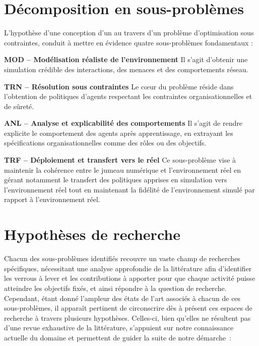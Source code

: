\section{Décomposition en sous-problèmes}

L'hypothèse d'une conception d'un  au travers d'un problème d'optimisation sous contraintes, conduit à mettre en évidence quatre sous-problèmes fondamentaux :

\medskip
\noindent
\textbf{\textbf{MOD} -- Modélisation réaliste de l'environnement}
Il s'agit d'obtenir une simulation crédible des interactions, des menaces et des comportements réseau.

\medskip
\noindent
\textbf{\textbf{TRN} -- Résolution sous contraintes}
Le cœur du problème réside dans l'obtention de politiques d'agents respectant les contraintes organisationnelles et de sûreté.

\medskip
\noindent
\textbf{\textbf{ANL} -- Analyse et explicabilité des comportements}
Il s'agit de rendre explicite le comportement des agents après apprentissage, en extrayant les spécifications organisationnelles comme des rôles ou des objectifs.

\medskip
\noindent
\textbf{\textbf{TRF} -- Déploiement et transfert vers le réel}
Ce sous-problème vise à maintenir la cohérence entre le jumeau numérique et l'environnement réel en gérant notamment le transfert des politiques apprises en simulation vers l'environnement réel tout en maintenant la fidélité de l'environnement simulé par rapport à l'environnement réel.

\clearpage

\section{Hypothèses de recherche}

Chacun des sous-problèmes identifiés recouvre un vaste champ de recherches spécifiques, nécessitant une analyse approfondie de la littérature afin d'identifier les verrous à lever et les contributions à apporter pour que chaque activité puisse atteindre les objectifs fixés, et ainsi répondre à la question de recherche. Cependant, étant donné l'ampleur des états de l'art associés à chacun de ces sous-problèmes, il apparaît pertinent de circonscrire dès à présent ces espaces de recherche à travers plusieurs hypothèses. Celles-ci, bien qu'elles ne résultent pas d'une revue exhaustive de la littérature, s'appuient sur notre connaissance actuelle du domaine et permettent de guider la suite de notre démarche~:

